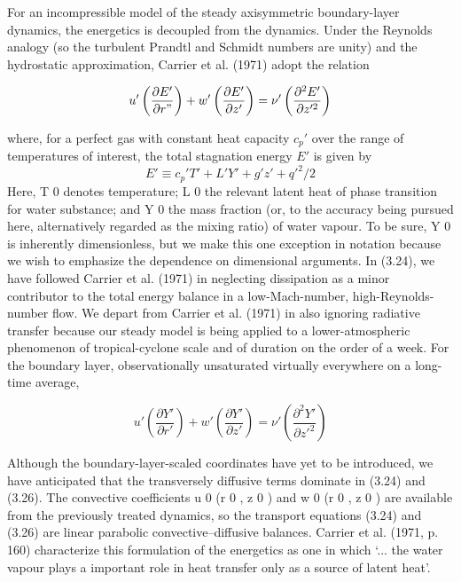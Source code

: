 \documentclass[preprint, prX]{revtex4}
\newcommand{\ppd}[2]{\left(\frac{\partial#1}{\partial#2}\right)}
\begin{document}
For an incompressible model of the steady axisymmetric boundary-layer dynamics, the energetics is decoupled from the dynamics. Under the Reynolds analogy (so the turbulent Prandtl and Schmidt numbers are unity) and the hydrostatic approximation, Carrier et al. (1971) adopt the relation

\begin{equation}
u' \ppd{E'}{r"} + w' \ppd{E'}{z'} = \nu'\left( \frac{\partial^2 E'}{\partial z'^2}\right )
\end{equation}

where, for a perfect gas with constant heat capacity $c_p'$ over the range of temperatures of interest, the total stagnation energy $E'$ is given by
\begin{equation}
E'\equiv c_p'T'+L'Y' + g'z' + q'^2 /2
\end{equation}
Here, T 0 denotes temperature; L 0 the relevant latent heat of phase transition for water substance; and Y 0 the mass fraction (or, to the accuracy being pursued here, alternatively regarded as the mixing ratio) of water vapour. To be sure, Y 0 is inherently dimensionless, but we make this one exception in notation because we wish to emphasize the dependence on dimensional arguments. In (3.24), we have followed Carrier et al. (1971) in neglecting dissipation as a minor contributor to the total energy balance in a low-Mach-number, high-Reynolds-number flow. We depart from Carrier et al. (1971) in also ignoring radiative transfer because our steady model is being applied to a lower-atmospheric phenomenon of tropical-cyclone scale and of duration on the order of a week. For the boundary layer, observationally unsaturated virtually everywhere on a long-time average,

\begin{equation}
u' \ppd{Y'}{r'} + w'\ppd{Y'}{z'} = \nu'\left( \frac{\partial^2 Y'}{\partial z'^2}\right )
\end{equation}

Although the boundary-layer-scaled coordinates have yet to be introduced, we have anticipated that the transversely diffusive terms dominate in (3.24) and (3.26). The convective coefficients u 0 (r 0 , z 0 ) and w 0 (r 0 , z 0 ) are available from the previously treated dynamics, so the transport equations (3.24) and (3.26) are linear parabolic convective–diffusive balances. Carrier et al. (1971, p. 160) characterize this formulation of the energetics as one in which `... the water vapour plays a important role in heat transfer only as a source of latent heat'.
\end{document}
